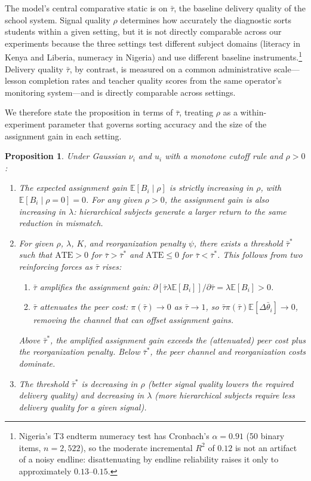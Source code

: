 \documentclass[11pt]{article}
\newtheorem{proposition}{Proposition}
\newcommand{\E}{\mathbb{E}}
\begin{document}
The model's central comparative static is on $\bar{\tau}$, the baseline delivery quality of the school system. Signal quality $\rho$ determines how accurately the diagnostic sorts students within a given setting, but it is not directly comparable across our experiments because the three settings test different subject domains (literacy in Kenya and Liberia, numeracy in Nigeria) and use different baseline instruments.\footnote{Nigeria's T3 endterm numeracy test has Cronbach's $\alpha = 0.91$ (50 binary items, $n = 2{,}522$), so the moderate incremental $R^2$ of $0.12$ is not an artifact of a noisy endline: disattenuating by endline reliability raises it only to approximately $0.13$--$0.15$.} Delivery quality $\bar{\tau}$, by contrast, is measured on a common administrative scale---lesson completion rates and teacher quality scores from the same operator's monitoring system---and is directly comparable across settings.

We therefore state the proposition in terms of $\bar{\tau}$, treating $\rho$ as a within-experiment parameter that governs sorting accuracy and the size of the assignment gain in each setting.

\begin{proposition}
\label{prop:threshold}
Under Gaussian $\nu_i$ and $u_i$ with a monotone cutoff rule and $\rho > 0$:
\begin{enumerate}
\item[(i)] The expected assignment gain $\E[B_i \mid \rho]$ is strictly increasing in $\rho$, with $\E[B_i \mid \rho = 0] = 0$. For any given $\rho > 0$, the assignment gain is also increasing in $\lambda$: hierarchical subjects generate a larger return to the same reduction in mismatch.

\item[(ii)] For given $\rho$, $\lambda$, $K$, and reorganization penalty $\psi$, there exists a threshold $\bar{\tau}^*$ such that $\text{ATE} > 0$ for $\bar{\tau} > \bar{\tau}^*$ and $\text{ATE} \leq 0$ for $\bar{\tau} < \bar{\tau}^*$. This follows from two reinforcing forces as $\bar{\tau}$ rises:
\begin{enumerate}
\item[(a)] $\bar{\tau}$ amplifies the assignment gain: $\partial[\bar{\tau}\lambda\E[B_i]]/\partial\bar{\tau} = \lambda\E[B_i] > 0$.
\item[(b)] $\bar{\tau}$ attenuates the peer cost: $\pi(\bar{\tau}) \to 0$ as $\bar{\tau} \to 1$, so $\bar{\tau}\pi(\bar{\tau})\E[\Delta\bar{\theta}_i] \to 0$, removing the channel that can offset assignment gains.
\end{enumerate}
Above $\bar{\tau}^*$, the amplified assignment gain exceeds the (attenuated) peer cost plus the reorganization penalty. Below $\bar{\tau}^*$, the peer channel and reorganization costs dominate.

\item[(iii)] The threshold $\bar{\tau}^*$ is decreasing in $\rho$ (better signal quality lowers the required delivery quality) and decreasing in $\lambda$ (more hierarchical subjects require less delivery quality for a given signal).
\end{enumerate}
\end{proposition}
\end{document}
